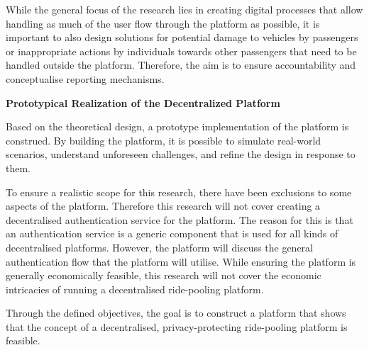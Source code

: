 While the general focus of the research lies in creating digital processes that allow handling as much of the user flow through the platform as possible, it is important to also design solutions for  potential damage to vehicles by passengers or inappropriate actions by individuals towards other passengers that need to be handled outside the platform. Therefore, the aim is to ensure accountability and conceptualise reporting mechanisms.

\textbf{Prototypical Realization of the Decentralized Platform}

Based on the theoretical design, a prototype implementation of the platform is construed. By building the platform,  it is possible to simulate real-world scenarios, understand unforeseen challenges, and refine the design in response to them.

To ensure a realistic scope for this research, there have been exclusions to some aspects of the platform. Therefore this research will not cover creating a decentralised authentication service for the platform. The reason for this is that an authentication service is a generic component that is used for all kinds of decentralised platforms. However, the platform will discuss the general authentication flow that the platform will utilise. While ensuring the platform is generally economically feasible, this research will not cover the economic intricacies of running a decentralised ride-pooling platform.

 Through the defined objectives, the goal is to construct a platform that shows that the concept of a decentralised, privacy-protecting ride-pooling platform is feasible.